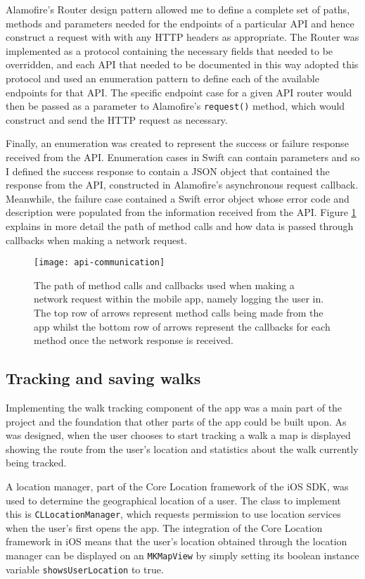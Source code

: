 Alamofire's Router design pattern allowed me to define a complete set of paths, methods and parameters needed for the endpoints of a particular API and hence construct a request with with any HTTP headers as appropriate. The Router was implemented as a protocol containing the necessary fields that needed to be overridden, and each API that needed to be documented in this way adopted this protocol and used an enumeration pattern to define each of the available endpoints for that API. The specific endpoint case for a given API router would then be passed as a parameter to Alamofire's \texttt{request()} method, which would construct and send the HTTP request as necessary.

Finally, an enumeration was created to represent the success or failure response received from the API. Enumeration cases in Swift can contain parameters and so I defined the success response to contain a JSON object that contained the response from the API, constructed in Alamofire's asynchronous request callback. Meanwhile, the failure case contained a Swift error object whose error code and description were populated from the information received from the API. Figure \ref{fig:api-communication} explains in more detail the path of method calls and how data is passed through callbacks when making a network request.

\begin{figure}[hbt]
  \centering
  \texttt{[image: api-communication]}
  \caption{The path of method calls and callbacks used when making a network request within the mobile app, namely logging the user in. The top row of arrows represent method calls being made from the app whilst the bottom row of arrows represent the callbacks for each method once the network response is received.}
  \label{fig:api-communication}
\end{figure}

\subsection{Tracking and saving walks}

Implementing the walk tracking component of the app was a main part of the project and the foundation that other parts of the app could be built upon. As was designed, when the user chooses to start tracking a walk a map is displayed showing the route from the user's location and statistics about the walk currently being tracked.

A location manager, part of the Core Location framework of the iOS SDK, was used to determine the geographical location of a user. The class to implement this is \verb|CLLocationManager|, which requests permission to use location services when the user's first opens the app. The integration of the Core Location framework in iOS means that the user's location obtained through the location manager can be displayed on an \verb|MKMapView| by simply setting its boolean instance variable \verb|showsUserLocation| to true.

